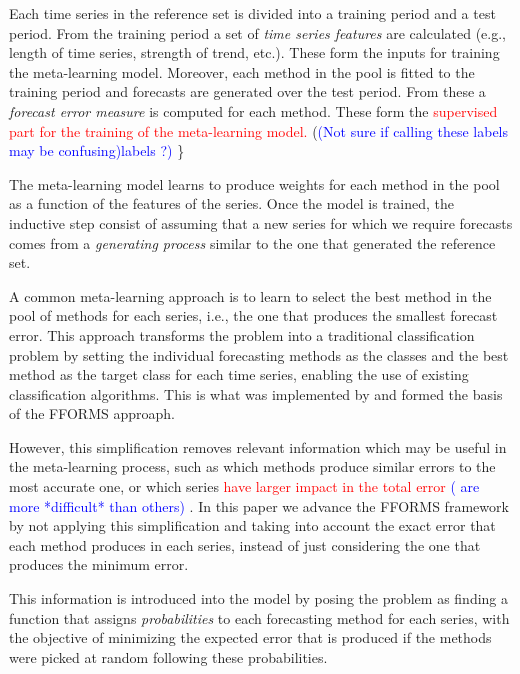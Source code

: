 \documentclass[11pt,a4paper,]{article}
\theoremstyle{definition}
\theoremstyle{definition}
\theoremstyle{definition}
\theoremstyle{remark}
\begin{document}
Each time series in the reference set is divided into a training period
and a test period. From the training period a set of \emph{time series
features} are calculated (e.g., length of time series, strength of
trend, etc.). These form the inputs for training the meta-learning
model. Moreover, each method in the pool is fitted to the training
period and forecasts are generated over the test period. From these a
\emph{forecast error measure} is computed for each method. These form
the
\textcolor{red}{ supervised part for the training of the meta-learning model.}
(\textcolor{blue}{(Not sure if calling these labels may be confusing)labels ?)}
\}

The meta-learning model learns to produce weights for each method in the
pool as a function of the features of the series. Once the model is
trained, the inductive step consist of assuming that a new series for
which we require forecasts comes from a \emph{generating process}
similar to the one that generated the reference set.

A common meta-learning approach is to learn to select the best method in
the pool of methods for each series, i.e., the one that produces the
smallest forecast error. This approach transforms the problem into a
traditional classification problem by setting the individual forecasting
methods as the classes and the best method as the target class for each
time series, enabling the use of existing classification algorithms.
This is what was implemented by \textcite{fforms} and formed the basis
of the FFORMS approaph.

However, this simplification removes relevant information which may be
useful in the meta-learning process, such as which methods produce
similar errors to the most accurate one, or which series
\textcolor{red}{ have larger impact in the total error}
\textcolor{blue}{( are more *difficult* than others)}
.
In this paper we advance the FFORMS framework by not applying this
simplification and taking into account the exact error that each method
produces in each series, instead of just considering the one that
produces the minimum error.

This information is introduced into the model by posing the problem as
finding a function that assigns \emph{probabilities} to each forecasting
method for each series, with the objective of minimizing the expected
error that is produced if the methods were picked at random following
these probabilities.
\end{document}
